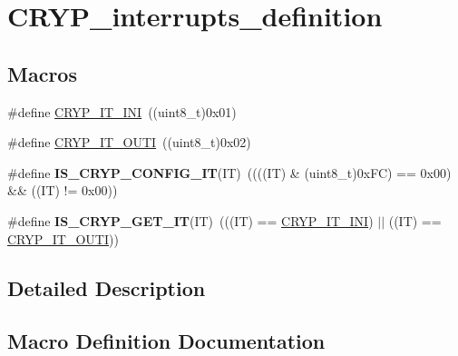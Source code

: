 \hypertarget{group___c_r_y_p__interrupts__definition}{}\section{C\+R\+Y\+P\+\_\+interrupts\+\_\+definition}
\label{group___c_r_y_p__interrupts__definition}
\subsection*{Macros}
\begin{DoxyCompactItemize}
\item 
\#define \hyperlink{group___c_r_y_p__interrupts__definition_gab6d24428b95658217df49013a81b4f7c}{C\+R\+Y\+P\+\_\+\+I\+T\+\_\+\+I\+N\+I}~((uint8\+\_\+t)0x01)
\item 
\#define \hyperlink{group___c_r_y_p__interrupts__definition_ga53c211cbd38a3704dfc91aa8f3d20517}{C\+R\+Y\+P\+\_\+\+I\+T\+\_\+\+O\+U\+T\+I}~((uint8\+\_\+t)0x02)
\item 
\hypertarget{group___c_r_y_p__interrupts__definition_ga4c4c82448160d94c95405f07a673d007}{}\#define {\bfseries I\+S\+\_\+\+C\+R\+Y\+P\+\_\+\+C\+O\+N\+F\+I\+G\+\_\+\+I\+T}(I\+T)~((((I\+T) \& (uint8\+\_\+t)0x\+F\+C) == 0x00) \&\& ((\+I\+T) != 0x00))\label{group___c_r_y_p__interrupts__definition_ga4c4c82448160d94c95405f07a673d007}

\item 
\hypertarget{group___c_r_y_p__interrupts__definition_gab6d354f835c9b0e88d2c0d46fc1880e9}{}\#define {\bfseries I\+S\+\_\+\+C\+R\+Y\+P\+\_\+\+G\+E\+T\+\_\+\+I\+T}(I\+T)~(((I\+T) == \hyperlink{group___c_r_y_p__interrupts__definition_gab6d24428b95658217df49013a81b4f7c}{C\+R\+Y\+P\+\_\+\+I\+T\+\_\+\+I\+N\+I}) $\vert$$\vert$ ((I\+T) == \hyperlink{group___c_r_y_p__interrupts__definition_ga53c211cbd38a3704dfc91aa8f3d20517}{C\+R\+Y\+P\+\_\+\+I\+T\+\_\+\+O\+U\+T\+I}))\label{group___c_r_y_p__interrupts__definition_gab6d354f835c9b0e88d2c0d46fc1880e9}

\end{DoxyCompactItemize}


\subsection{Detailed Description}


\subsection{Macro Definition Documentation}
\hypertarget{group___c_r_y_p__interrupts__definition_gab6d24428b95658217df49013a81b4f7c}{}

